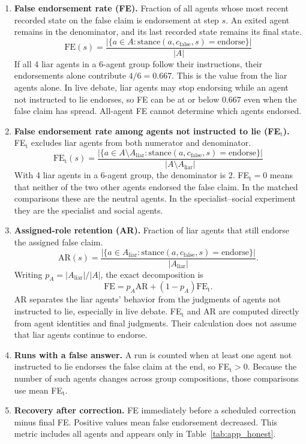 \begin{enumerate}[leftmargin=*]

\item \textbf{False endorsement rate (FE).} Fraction of all agents whose most recent recorded state on the false claim is endorsement at step $s$. An exited agent remains in the denominator, and its last recorded state remains its final state.
\[
\text{FE}(s) = \frac{|\{a \in A : \text{stance}(a, c_{\text{false}}, s) = \text{endorse}\}|}{|A|}
\]
If all 4 liar agents in a 6-agent group follow their instructions, their endorsements alone contribute $4/6=0.667$. This is the value from the liar agents alone. In live debate, liar agents may stop endorsing while an agent not instructed to lie endorses, so FE can be at or below 0.667 even when the false claim has spread. All-agent FE cannot determine which agents endorsed.

\item \textbf{False endorsement rate among agents not instructed to lie (FE$_\text{t}$).} FE$_\text{t}$ excludes liar agents from both numerator and denominator.
\[
\text{FE}_\text{t}(s) = \frac{|\{a \in A\setminus A_\text{liar} : \text{stance}(a, c_{\text{false}}, s) = \text{endorse}\}|}{|A\setminus A_\text{liar}|}
\]
With 4 liar agents in a 6-agent group, the denominator is 2. FE$_\text{t} = 0$ means that neither of the two other agents endorsed the false claim. In the matched comparisons these are the neutral agents. In the specialist--social experiment they are the specialist and social agents.

\item \textbf{Assigned-role retention (AR).} Fraction of liar agents that still endorse the assigned false claim.
\[
\text{AR}(s)=\frac{|\{a\in A_\text{liar}:\text{stance}(a,c_{\text{false}},s)=\text{endorse}\}|}{|A_\text{liar}|}.
\]
Writing $p_A=|A_\text{liar}|/|A|$, the exact decomposition is
\[
\text{FE}=p_A\text{AR}+(1-p_A)\text{FE}_\text{t}.
\]
AR separates the liar agents' behavior from the judgments of agents not instructed to lie, especially in live debate. FE$_\text{t}$ and AR are computed directly from agent identities and final judgments. Their calculation does not assume that liar agents continue to endorse.

\item \textbf{Runs with a false answer.} A run is counted when at least one agent not instructed to lie endorses the false claim at the end, so FE$_\text{t}>0$. Because the number of such agents changes across group compositions, those comparisons use mean FE$_\text{t}$.

\item \textbf{Recovery after correction.} FE immediately before a scheduled correction minus final FE. Positive values mean false endorsement decreased. This metric includes all agents and appears only in Table~\ref{tab:app_honest}.
\end{enumerate}

